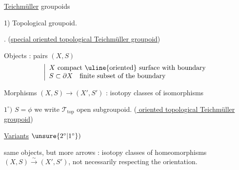 \uline{Teichmüller} groupoids

1) Topological groupoid. .
(\uline{special oriented topological Teichmüller groupoid})

Objects : pairs $(X,S)$
\[
\left|\begin{array}{l}
X\ \text{compact \uline{oriented} surface with boundary}\\
S\subset\partial X\quad\text{finite subset of the boundary}
\end{array}\right.
\]

Morphisms $(X,S)\longrightarrow(X',S')$ : isotopy classes of isomorphisms

$1^\circ)$ $S=\phi$ we write $\mathcal T_{\mathrm{top}}$ open subgroupoid.
(\uline{ oriented topological Teichmüller groupoid})

 \uline{Variants}
$\unsure{2^\circ|1^\circ})$  same objects, but more arrows :
isotopy classes of homeomorphisms $(X,S)\xrightarrow{\sim}(X',S')$, not necessarily respecting the orientation.

